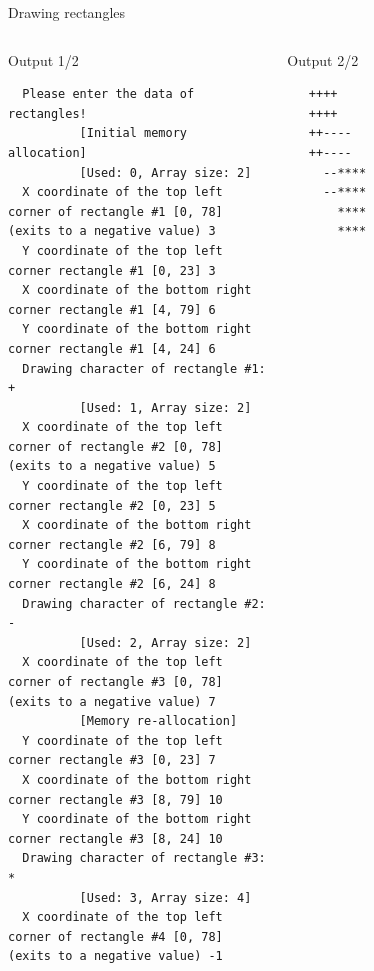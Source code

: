 \documentclass[usenames,dvipsnames,aspectratio=169]{beamer}
\begin{document}
\begin{frame}[fragile]{Drawing rectangles}
  \begin{columns}[T]
      \begin{block}{Output 1/2}
        \tiny
        \begin{verbatim}
  Please enter the data of rectangles!
          [Initial memory allocation]
          [Used: 0, Array size: 2]
  X coordinate of the top left corner of rectangle #1 [0, 78] (exits to a negative value) 3
  Y coordinate of the top left corner rectangle #1 [0, 23] 3
  X coordinate of the bottom right corner rectangle #1 [4, 79] 6
  Y coordinate of the bottom right corner rectangle #1 [4, 24] 6
  Drawing character of rectangle #1: +
          [Used: 1, Array size: 2]
  X coordinate of the top left corner of rectangle #2 [0, 78] (exits to a negative value) 5
  Y coordinate of the top left corner rectangle #2 [0, 23] 5
  X coordinate of the bottom right corner rectangle #2 [6, 79] 8
  Y coordinate of the bottom right corner rectangle #2 [6, 24] 8
  Drawing character of rectangle #2: -
          [Used: 2, Array size: 2]
  X coordinate of the top left corner of rectangle #3 [0, 78] (exits to a negative value) 7
          [Memory re-allocation]
  Y coordinate of the top left corner rectangle #3 [0, 23] 7
  X coordinate of the bottom right corner rectangle #3 [8, 79] 10
  Y coordinate of the bottom right corner rectangle #3 [8, 24] 10
  Drawing character of rectangle #3: *
          [Used: 3, Array size: 4]
  X coordinate of the top left corner of rectangle #4 [0, 78] (exits to a negative value) -1
\end{verbatim}
      \end{block}
      \begin{block}{Output 2/2}
        \begin{verbatim}
   ++++                                                                         
   ++++                                                                         
   ++----                                                                       
   ++----                                                                       
     --****                                                                     
     --****                                                                     
       ****                                                                     
       ****
\end{verbatim}
      \end{block}
  \end{columns}
\end{frame}
\end{document}
